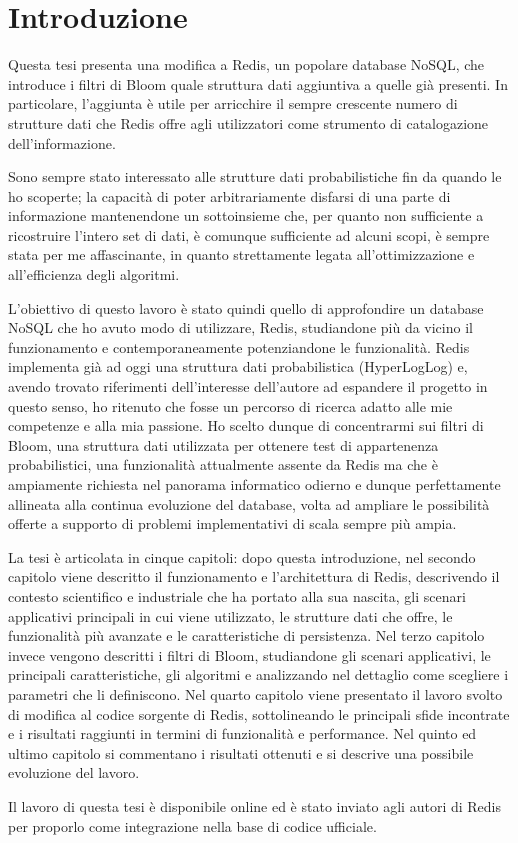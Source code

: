 \chapter{Introduzione}

Questa tesi presenta una modifica a Redis, un popolare database NoSQL, che introduce i filtri di
Bloom quale struttura dati aggiuntiva a quelle già presenti. In particolare, 
l'aggiunta è utile per arricchire il sempre crescente numero di strutture dati che Redis offre agli
utilizzatori come strumento di catalogazione dell'informazione.

Sono sempre stato interessato alle strutture dati probabilistiche fin da quando le ho scoperte; la
capacità di poter arbitrariamente disfarsi di una parte di informazione mantenendone un sottoinsieme
che, per quanto non sufficiente a ricostruire l'intero set di dati, è comunque sufficiente ad alcuni
scopi, è sempre stata per me affascinante, in quanto strettamente legata all'ottimizzazione e
all'efficienza degli algoritmi.

L'obiettivo di questo lavoro è stato quindi quello di approfondire un database NoSQL che ho avuto
modo di utilizzare, Redis, studiandone più da vicino il funzionamento e contemporaneamente
potenziandone le funzionalità. Redis implementa già ad oggi una struttura dati probabilistica
(HyperLogLog) e, avendo trovato riferimenti dell'interesse dell'autore ad espandere il progetto in
questo senso, ho ritenuto che fosse un percorso di ricerca adatto alle mie competenze e alla mia
passione. Ho scelto dunque di concentrarmi sui filtri di Bloom, una struttura dati utilizzata
per ottenere test di appartenenza probabilistici, una funzionalità attualmente assente da
Redis ma che è ampiamente richiesta nel panorama informatico odierno e dunque perfettamente
allineata alla continua evoluzione del database, volta ad ampliare le possibilità offerte a
supporto di problemi implementativi di scala sempre più ampia.

La tesi è articolata in cinque capitoli: dopo questa introduzione, nel secondo capitolo viene
descritto il funzionamento e l'architettura di Redis, descrivendo il contesto scientifico e
industriale che ha portato alla sua nascita, gli scenari applicativi principali in cui viene
utilizzato, le strutture dati che offre, le funzionalità più avanzate e le caratteristiche di
persistenza. Nel terzo capitolo invece vengono descritti i filtri di Bloom, studiandone gli scenari
applicativi, le principali caratteristiche, gli algoritmi e analizzando nel dettaglio come scegliere
i parametri che li definiscono. Nel quarto capitolo viene presentato il lavoro svolto di modifica
al codice sorgente di Redis, sottolineando le principali sfide incontrate e i risultati raggiunti in
termini di funzionalità e performance. Nel quinto ed ultimo capitolo si commentano i risultati
ottenuti e si descrive una possibile evoluzione del lavoro.

Il lavoro di questa tesi è disponibile online ed è stato inviato agli autori di Redis per
proporlo come integrazione nella base di codice ufficiale.

